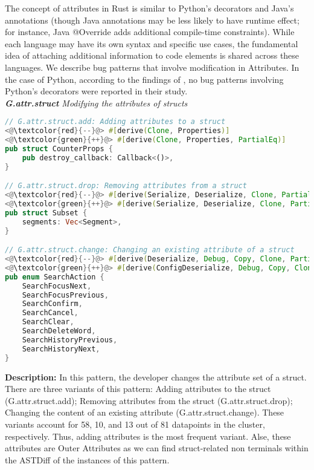 The concept of attributes in Rust is similar to Python's decorators and Java's annotations (though Java annotations may be less likely to have runtime effect; for instance, Java @Override adds additional compile-time constraints). While each language may have its own syntax and specific use cases, the fundamental idea of attaching additional information to code elements is shared across these languages. We describe bug patterns that involve modification in Attributes. In the case of Python, according to the findings of \cite{yang2022mining}, no bug patterns involving Python's decorators were reported in their study. \\

\noindent\textit{\label{sec:G.attr.struct}\textbf{G.attr.struct} Modifying the attributes of structs}

\begin{lstlisting}[language=Rust, style=colouredRust]
// G.attr.struct.add: Adding attributes to a struct
<@\textcolor{red}{--}@> #[derive(Clone, Properties)]
<@\textcolor{green}{++}@> #[derive(Clone, Properties, PartialEq)]
pub struct CounterProps {
    pub destroy_callback: Callback<()>,
}

// G.attr.struct.drop: Removing attributes from a struct
<@\textcolor{red}{--}@> #[derive(Serialize, Deserialize, Clone, PartialEq, Eq, Debug)]
<@\textcolor{green}{++}@> #[derive(Serialize, Deserialize, Clone, PartialEq, Eq)]
pub struct Subset {
    segments: Vec<Segment>,
}

// G.attr.struct.change: Changing an existing attribute of a struct
<@\textcolor{red}{--}@> #[derive(Deserialize, Debug, Copy, Clone, PartialEq, Eq)]
<@\textcolor{green}{++}@> #[derive(ConfigDeserialize, Debug, Copy, Clone, PartialEq, Eq)]
pub enum SearchAction {
    SearchFocusNext,
    SearchFocusPrevious,
    SearchConfirm,
    SearchCancel,
    SearchClear,
    SearchDeleteWord,
    SearchHistoryPrevious,
    SearchHistoryNext,
}
\end{lstlisting}

\noindent\textbf{Description:} In this pattern, the developer changes the attribute set of a struct. There are three variants of this pattern: Adding attributes to the struct (G.attr.struct.add); Removing attributes from the struct (G.attr.struct.drop); Changing the content of an existing attribute (G.attr.struct.change). These variants account for 58, 10, and 13 out of 81 datapoints in the cluster, respectively. Thus, adding attributes is the most frequent variant. Alse, these attributes are Outer Attributes as we can find struct-related non terminals within the ASTDiff of the instances of this pattern.


